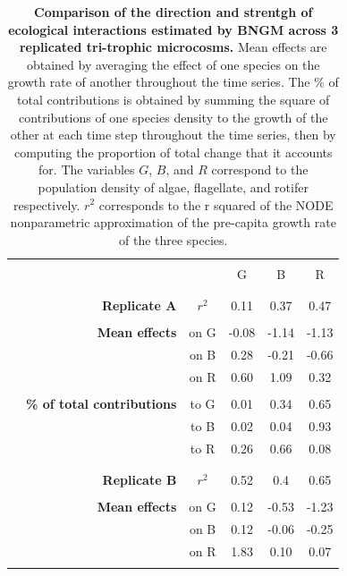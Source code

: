 \documentclass[11pt, oneside]{article}
\begin{document}
\newpage
\begin{table}[H]
\begin{center}
\caption{
    \textbf{Comparison of the direction and strentgh of ecological interactions estimated by BNGM across 3 replicated tri-trophic microcosms.}
    Mean effects are obtained by averaging the effect of one species on the growth rate of another throughout the time series.
    The \% of total contributions is obtained by summing the square of contributions of one species density to the growth of the other at each time step throughout the time series, then by computing the proportion of total change that it accounts for.
    The variables $G$, $B$, and $R$ correspond to the population density of algae, flagellate, and rotifer respectively.
    $r^2$ corresponds to the r squared of the NODE nonparametric approximation of the pre-capita growth rate of the three species.
}
\begin{tabular}{rrcccc}
	\hline
	\\
	& & & G & B & R \\
	& \\
	\hline
	& \\
	& \textbf{Replicate A} & $r^2$ & 0.11 & 0.37 & 0.47 \\
	& \\
	& \textbf{Mean effects} 
	&   on G &  -0.08 & -1.14 & -1.13 \\
	& & on B &   0.28 & -0.21 & -0.66 \\
    & & on R &   0.60 &  1.09 &  0.32 \\
	& \\
	& \textbf{\% of total contributions} 
	&   to G &   0.01 & 0.34 & 0.65 \\ 
    & & to B &   0.02 & 0.04 & 0.93 \\
    & & to R &   0.26 & 0.66 & 0.08 \\
	& \\
	\hline
	& \\
    & \textbf{Replicate B} & $r^2$  &  0.52 & 0.4 & 0.65 \\
	& \\
	& \textbf{Mean effects} 
    &   on G &  0.12 & -0.53 & -1.23 \\
	& & on B &  0.12 & -0.06 & -0.25 \\
	& & on R &  1.83 &  0.10 &  0.07 \\
	& \\

\end{tabular}
\end{center}
\end{table}
\end{document}
